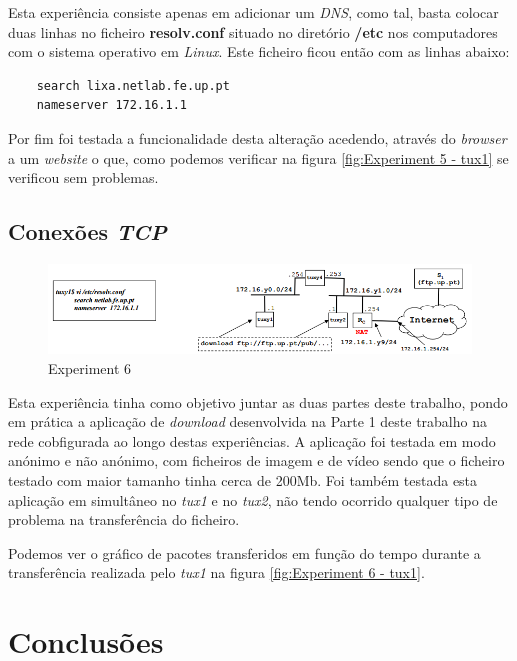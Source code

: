 \documentclass[a4paper]{article}
\begin{document}
	Esta experiência consiste apenas em adicionar um \textit{DNS}, como tal, basta colocar duas linhas no ficheiro \textbf{resolv.conf} situado no diretório \textbf{/etc} nos computadores com o sistema operativo em \textit{Linux}. Este ficheiro ficou então com as linhas abaixo:

	\lstset{
	title=resolf.conf
	}

	\begin{lstlisting}
	search lixa.netlab.fe.up.pt
	nameserver 172.16.1.1
	\end{lstlisting}

	Por fim foi testada a funcionalidade desta alteração acedendo, através do \textit{browser} a um \textit{website} o que, como podemos verificar na figura \ref{fig:Experiment 5 - tux1} se verificou sem problemas.

	\subsection{Conexões \textit{TCP}}

	\begin{figure}[H]
	\begin{center}
  	\includegraphics[width=0.8\linewidth]{exp6.png}
  	\caption{Experiment 6}
  	\label{fig:Experiment 6}
	\end{center}
	\end{figure}

	Esta experiência tinha como objetivo juntar as duas partes deste trabalho, pondo em prática a aplicação de \textit{download} desenvolvida na Parte 1 deste trabalho na rede cobfigurada ao longo destas experiências. A aplicação foi testada em modo anónimo e não anónimo, com ficheiros de imagem e de vídeo sendo que o ficheiro testado com maior tamanho tinha cerca de 200Mb. Foi também testada esta aplicação em simultâneo no \textit{tux1} e no \textit{tux2}, não tendo ocorrido qualquer tipo de problema na transferência do ficheiro.

	Podemos ver o gráfico de pacotes transferidos em função do tempo durante a transferência realizada pelo \textit{tux1} na figura \ref{fig:Experiment 6 - tux1}.

	\clearpage

	\section{Conclusões}
\end{document}
